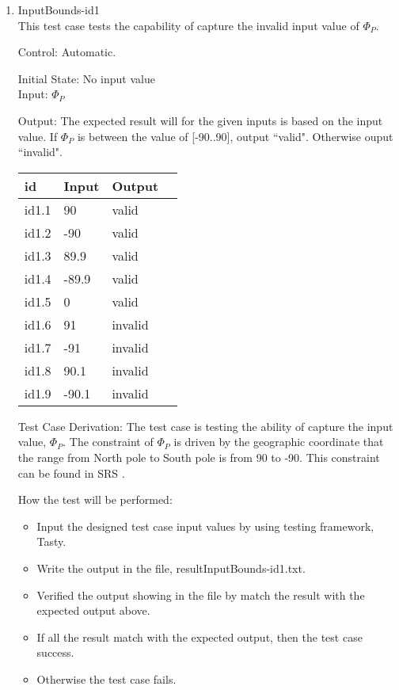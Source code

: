 \documentclass[12pt, titlepage]{article}
\begin{document}
\begin{enumerate}
\item{InputBounds-id1\\} 
This test case tests the capability of capture the invalid input value of $\Phi_P$.

Control: Automatic. 

Initial State: No input value\\
Input: $\Phi_P$ 


Output: The expected result will for the given inputs is based on the input value.
If $\Phi_P$ is between the value of [-90..90], output ``valid". Otherwise ouput ``invalid".


\noindent \begin{tabular}{l l l l} 
    \toprule		
    \textbf{id} & \textbf{Input} & \textbf{Output}\\ 
	\midrule
   id1.1 &  90  & valid\\
   id1.2 & -90  & valid\\
   id1.3 &  89.9  & valid\\
   id1.4 & -89.9  & valid\\
   id1.5 & 0  & valid\\
   id1.6 & 91  & invalid\\
   id1.7 & -91  & invalid\\
   id1.8 & 90.1  & invalid\\
   id1.9 & -90.1  & invalid\\
    \bottomrule
  \end{tabular}



Test Case Derivation: The test case is testing the ability of capture the input value, $\Phi_P$. The constraint of $\Phi_P$  is driven by the geographic coordinate that the range from North pole to South pole is from 90 to -90. This constraint can be found in SRS \cite{YS2019}.


How the test will be performed:

\begin{itemize} 
\item Input the designed test case input values by using testing framework, Tasty. 
\item Write the output in the file, resultInputBounds-id1.txt.
\item Verified the output showing in the file by match the result with the expected output above.
\item If all the result match with the expected output, then the test case success.
\item Otherwise the test case fails.
\end{itemize}


\end{enumerate}
\end{document}
